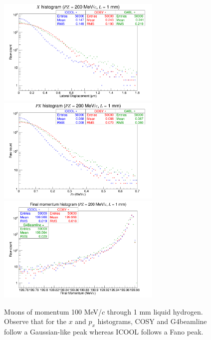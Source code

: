 \begin{figure}[H]
  \centering
    \includegraphics[width=0.7\textwidth]{Benchmarking/LH/X.200.1.png} 
    \includegraphics[width=0.7\textwidth]{Benchmarking/LH/PX.200.1.png} 
    \includegraphics[width=0.7\textwidth]{Benchmarking/LH/strag.200.1.png} 
  \caption[Muons of momentum 200 MeV/$c$ through 1 mm liquid hydrogen.]{Muons of momentum 100 MeV/$c$ through 1 mm liquid hydrogen. Observe that for the $x$ and $p_x$ histograms, COSY and G4beamline follow a Gaussian-like peak whereas ICOOL follows a Fano peak.}
  \label{fig:200.1}
\end{figure}

